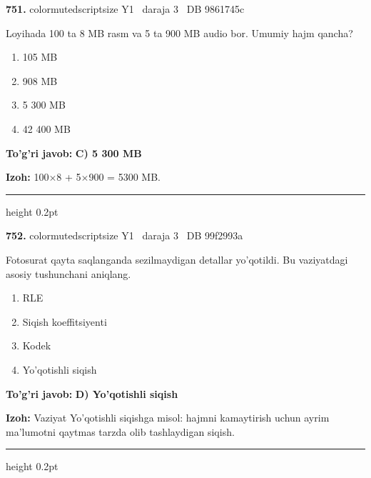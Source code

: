 \documentclass[10pt,a4paper,oneside]{article}
\begin{document}
\noindent\textbf{\color{ink}751.}  {color{muted}scriptsize Y1 \textbullet\ daraja 3 \textbullet\ DB 9861745c}
\par
Loyihada 100 ta 8 MB rasm va 5 ta 900 MB audio bor. Umumiy hajm qancha?
\begin{enumerate}[label=\Alph*),leftmargin=9mm]
\item 105 MB
\item 908 MB
\item 5 300 MB
\item 42 400 MB
\end{enumerate}
\begin{tcolorbox}[enhanced,breakable,colback=teal!4,colframe=teal!50!black,boxrule=0.5pt,arc=1.1mm,left=3mm,right=3mm,top=1.7mm,bottom=1.7mm,before skip=2mm,after skip=2mm]
\textbf{\color{teal}To'g'ri javob:} \textbf{C) 5 300 MB}
\par\smallskip
\textbf{Izoh:} 100\ensuremath{\times}8 + 5\ensuremath{\times}900 = 5300 MB.
\end{tcolorbox}
\vspace{2mm}\hrule height 0.2pt \vspace{3mm}

\noindent\textbf{\color{ink}752.}  {color{muted}scriptsize Y1 \textbullet\ daraja 3 \textbullet\ DB 99f2993a}
\par
Fotosurat qayta saqlanganda sezilmaydigan detallar yo'qotildi. Bu vaziyatdagi asosiy tushunchani aniqlang.
\begin{enumerate}[label=\Alph*),leftmargin=9mm]
\item RLE
\item Siqish koeffitsiyenti
\item Kodek
\item Yo'qotishli siqish
\end{enumerate}
\begin{tcolorbox}[enhanced,breakable,colback=teal!4,colframe=teal!50!black,boxrule=0.5pt,arc=1.1mm,left=3mm,right=3mm,top=1.7mm,bottom=1.7mm,before skip=2mm,after skip=2mm]
\textbf{\color{teal}To'g'ri javob:} \textbf{D) Yo'qotishli siqish}
\par\smallskip
\textbf{Izoh:} Vaziyat Yo'qotishli siqishga misol: hajmni kamaytirish uchun ayrim ma'lumotni qaytmas tarzda olib tashlaydigan siqish.
\end{tcolorbox}
\vspace{2mm}\hrule height 0.2pt \vspace{3mm}
\end{document}
